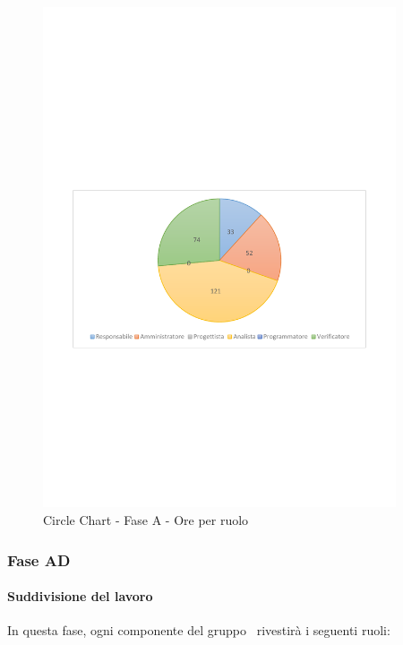 \documentclass[../PianoProgetto.tex]{subfiles}
\begin{document}
	\begin{figure}[!h]
		\centering
		\includegraphics[width=0.93\textwidth , trim=2cm 9.5cm 2cm 11cm]{grafici/A/A-ore-ruolo}
			\caption{Circle Chart - Fase A - Ore per ruolo}
		\label{fig:CircleChart-faseA_ore_r}
	\end{figure}
\vfill	
	
	\subsubsection{Fase AD}
				\paragraph{Suddivisione del lavoro}
					In questa fase, ogni componente del gruppo \leaf\ rivestirà i seguenti ruoli:
	
\end{document}
